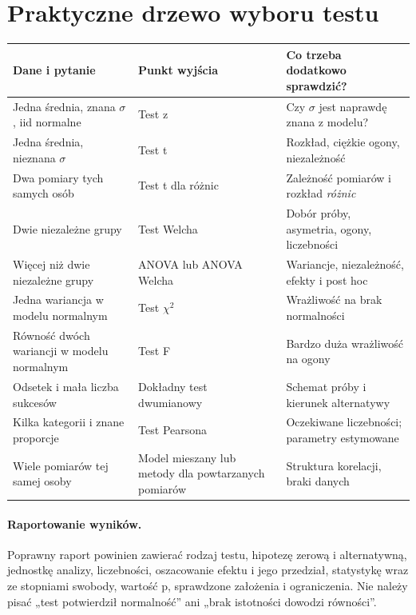 \section{Praktyczne drzewo wyboru testu}
\begin{center}\small
\begin{tabular}{>{\raggedright\arraybackslash}p{}>{\raggedright\arraybackslash}p{}>{\raggedright\arraybackslash}p{}}
\toprule
\textbf{Dane i pytanie} & \textbf{Punkt wyjścia} & \textbf{Co trzeba dodatkowo sprawdzić?}\\
\midrule
Jedna średnia, znana $\sigma$, iid normalne & Test z & Czy $\sigma$ jest naprawdę znana z modelu?\\
Jedna średnia, nieznana $\sigma$ & Test t & Rozkład, ciężkie ogony, niezależność\\
Dwa pomiary tych samych osób & Test t dla różnic & Zależność pomiarów i rozkład \emph{różnic}\\
Dwie niezależne grupy & Test Welcha & Dobór próby, asymetria, ogony, liczebności\\
Więcej niż dwie niezależne grupy & ANOVA lub ANOVA Welcha & Wariancje, niezależność, efekty i post hoc\\
Jedna wariancja w modelu normalnym & Test $\chi^2$ & Wrażliwość na brak normalności\\
Równość dwóch wariancji w modelu normalnym & Test F & Bardzo duża wrażliwość na ogony\\
Odsetek i mała liczba sukcesów & Dokładny test dwumianowy & Schemat próby i kierunek alternatywy\\
Kilka kategorii i znane proporcje & Test Pearsona & Oczekiwane liczebności; parametry estymowane\\
Wiele pomiarów tej samej osoby & Model mieszany lub metody dla powtarzanych pomiarów & Struktura korelacji, braki danych\\
\bottomrule
\end{tabular}
\end{center}

\paragraph{Raportowanie wyników.}
Poprawny raport powinien zawierać rodzaj testu, hipotezę
zerową i alternatywną, jednostkę analizy, liczebności,
oszacowanie efektu i jego przedział, statystykę wraz ze
stopniami swobody, wartość p, sprawdzone założenia i
ograniczenia. Nie należy pisać „test potwierdził normalność”
ani „brak istotności dowodzi równości”.


